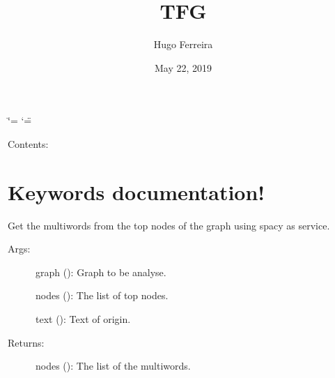 \documentclass[letterpaper,10pt,english]{sphinxmanual}
\title{TFG}
\date{May 22, 2019}
\author{Hugo Ferreira}
\begin{document}
\ifdefined\shorthandoff
  \ifnum\catcode`\=\string=\active\shorthandoff{=}\fi
  \ifnum\catcode`\"=\active{}\fi
\fi

\pagestyle{empty}
\sphinxmaketitle
\pagestyle{plain}
\sphinxtableofcontents
\pagestyle{normal}
\label{\detokenize{index::doc}}


Contents:


\chapter{Keywords documentation!}
\label{\detokenize{keywords:module-keywords}}\label{\detokenize{keywords:keywords-documentation}}\label{\detokenize{keywords::doc}}\label{\detokenize{keywords:module-keywords}}

\begin{fulllineitems}
\label{\detokenize{keywords:keywords.Concatenate_candidates_grampal}}
Get the multiwords from the top nodes of the graph using spacy as service.
\begin{description}
\item[{Args:}] \leavevmode
graph (): Graph to be analyse.

nodes (): The list of top nodes.

text (): Text of origin.

\item[{Returns:}] \leavevmode
nodes (): The list of the multiwords.

\end{description}

\end{fulllineitems}

\end{document}

